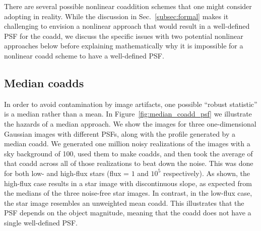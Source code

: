 \documentclass{aastex63}
\begin{document}
There are several possible nonlinear coaddition schemes that one might consider adopting in reality.  While the discussion in Sec.~\ref{subsec:formal} makes it challenging to envision a nonlinear approach that would result in a well-defined PSF for the coadd, we discuss the specific issues with two potential nonlinear approaches below before explaining mathematically why it is impossible for a nonlinear coadd scheme to have a well-defined PSF.

\subsection{Median coadds}

In order to avoid contamination by image artifacts, one possible ``robust statistic'' is a median rather than a mean.  In Figure~\ref{fig:median_coadd_psf} we illustrate the hazards of a median approach.
We show the images for three one-dimensional Gaussian images with different PSFs, along with the profile generated by a median coadd.  We generated one million noisy realizations of the images with a sky background of 100,  used them to make coadds, and then took the average of that coadd across all of those realizations to beat down the noise.  This was done for both low- and high-flux stars (flux = $1$ and $10^5$ respectively).
As shown, the high-flux case results in a star image with discontinuous slope, as expected from the medians of the three noise-free star images.  In contrast, in the low-flux case, the star image resembles an unweighted mean coadd. 
This illustrates that the PSF depends on the object magnitude, meaning that the coadd does not have a single well-defined PSF.
\end{document}
